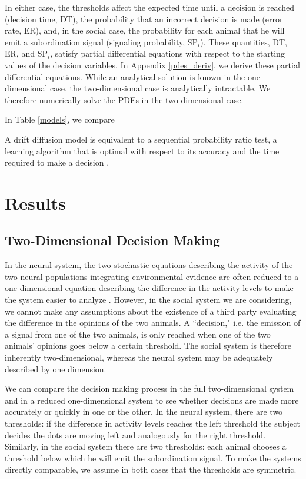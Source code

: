 \documentclass{article}
\begin{document}
In either case, the thresholds affect the expected time until a decision is reached (decision time, DT), the probability that an incorrect decision is made (error rate, ER), and, in the social case, the probability for each animal that he will emit a subordination signal (signaling probability, $\text{SP}_i$).  These quantities, DT, ER, and $\text{SP}_i$, satisfy partial differential equations with respect to the starting values of the decision variables. In Appendix \ref{pdes_deriv}, we derive these partial differential equations.  While an analytical solution is known in the one-dimensional case, the two-dimensional case is analytically intractable.  We therefore numerically solve the PDEs in the two-dimensional case.

In Table \ref{models}, we compare 

A drift diffusion model is equivalent to a sequential probability ratio test, a learning algorithm that is optimal with respect to its accuracy and the time required to make a decision \cite{Moehlis:2004fk,Bogacz:2006uq}.  



\section{Results}

\subsection{Two-Dimensional Decision Making }
In the neural system, the two stochastic equations describing the activity of the two neural populations integrating environmental evidence are often reduced to a one-dimensional equation describing the difference in the activity levels to make the system easier to analyze \cite{Brown:2005fk,Bogacz:2006uq,Feng:2009kl}.  However, in the social system we are considering, we cannot make any assumptions about the existence of a third party evaluating the difference in the opinions of the two animals.  A ``decision," i.e. the emission of a signal from one of the two animals, is only reached when one of the two animals' opinions goes below a certain threshold.  The social system is therefore inherently two-dimensional, whereas the neural system may be adequately described by one dimension. 

We can compare the decision making process in the full two-dimensional system and in a reduced one-dimensional system to see whether decisions are made more accurately or quickly in one or the other. In the neural system, there are two thresholds: if the difference in activity levels reaches the left threshold the subject decides the dots are moving left and analogously for the right threshold.  Similarly, in the social system there are two thresholds: each animal chooses a threshold below which he will emit the subordination signal. To make the systems directly comparable, we assume in both cases that the thresholds are symmetric.
\end{document}
